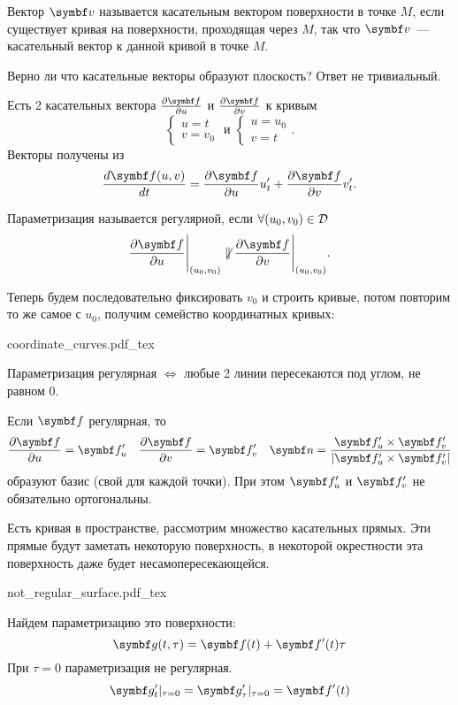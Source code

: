 \documentclass[main]{subfiles}
\begin{document}
\begin{definition}
    Вектор $\vv$ называется касательным вектором поверхности в точке $M$,
    если существует кривая на поверхности, проходящая через $M$, так что
    $\vv$~--- касательный вектор к данной кривой в точке $M$.
\end{definition}

Верно ли что касательные векторы образуют плоскость? Ответ не тривиальный.

Есть 2 касательных вектора
$\frac{\partial \vf}{\partial u}$ и $\frac{\partial \vf}{\partial v}$ к кривым
\[\begin{cases}
        u = t \\
        v = v_0
    \end{cases}
    \text{ и }
    \begin{cases}
        u = u_0 \\
        v = t
    \end{cases}.\]
Векторы получены из
\[\frac{d\vf(u,v)}{dt} = \frac{\partial\vf}{\partial u} u_t' + \frac{\partial\vf}{\partial v} v_t'.\]

\begin{definition}
    Параметризация называется регулярной, если $\forall (u_0, v_0) \in \mathcal{D}$
    \[\frac{\partial\vf}{\partial u}\Bigg|_{(u_0, v_0)}
        \not\parallel
        \frac{\partial\vf}{\partial v}\Bigg|_{(u_0, v_0)}.\]
\end{definition}
Теперь будем последовательно фиксировать $v_0$ и строить кривые,
потом повторим то же самое с $u_0$, получим семейство координатных кривых:
\begin{center}
    {coordinate_curves.pdf_tex}
\end{center}
Параметризация регулярная $\Leftrightarrow$ любые 2 линии пересекаются под углом, не равном 0.

Если $\vf$ регулярная, то
\[
    \frac{\partial \vf}{\partial u} = \vf'_u \quad
    \frac{\partial \vf}{\partial v} = \vf'_v \quad
    \vn = \frac{\vf_u' \times \vf_v'}{|\vf_u' \times \vf_v'|}
\]
образуют базис (свой для каждой точки).
При этом $\vf_u'$ и $\vf_v'$ не обязательно ортогональны.

\begin{example}
    Есть кривая в пространстве, рассмотрим множество касательных прямых.
    Эти прямые будут заметать некоторую поверхность, в некоторой окрестности эта поверхность даже будет несамопересекающейся.
    \begin{center}
        \def\svgwidth{0.6\linewidth}
        {not_regular_surface.pdf_tex}
    \end{center}
    Найдем параметризацию это поверхности:
    \[\vg(t, \tau) = \vf(t) + \vf'(t) \tau\]
    При $\tau = 0$ параметризация не регулярная.
    \[\vg_t' |_{\tau = 0} = \vg_\tau'|_{\tau =0} = \vf'(t)\]
\end{example}
\end{document}

